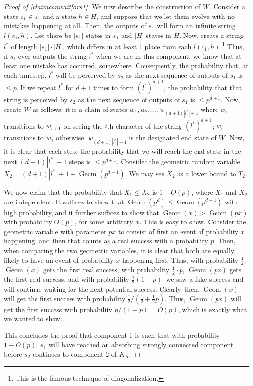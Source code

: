 \documentclass[12pt]{article}
\theoremstyle{definition}
\theoremstyle{remark}
\begin{document}
\begin{proof}[Proof of \cref{claimcanwaitfors1}]
        We now describe the construction of $W$. Consider a state $c_1 \in s_1$ and a state $h \in H$, and suppose that we let them evolve with no mistakes happening at all. Then, the outputs of $s_1$ will form an infinite string $l(c_1, h)$. Let there be $|s_1|$ states in $s_1$ and $|H|$ states in $H$. Now, create a string $l^*$ of length $|s_1| \cdot |H|$, which differs in at least 1 place from each $l(c_1,h)$.\footnote{This is the famous technique of diagonalization.} Thus, if $s_1$ ever outputs the string $l^*$ when we are in this component, we know that at least one mistake has occurred, somewhere. Consequently, the probability that, at each timestep, $l^*$ will be perceived by $s_2$ as the next sequence of outputs of $s_1$ is $\leq p$. 
        If we repeat $l^*$ for $d+1$ times to form $(l^*)^{d+1}$, the probability that that string is perceived by $s_2$ as the next sequence of outputs of $s_1$ is $\leq p^{d+1}$.
        Now, create $W$ as follows: it is a chain of states $w_1,w_2,\ldots,w_{(d+1)|l^*|+1}$ where $w_i$ transitions to $w_{i+1}$ on seeing the $i$th character of the string $(l^*)^{d+1}$; $w_i$ transitions to $w_1$ otherwise. $w_{(d+1)|l^*|+1}$ is the designated end state of $W$. Now, it is clear that each step, the probability that we will reach the end state in the next $(d+1)|l^*|+1$ steps is $\leq p^{d+1}$. Consider the geometric random variable $X_2 = (d+1)|l^*| + 1 + \operatorname{Geom} (p^{d+1})$. We may see $X_2$ as a lower bound to $T_2$.

        We now claim that the probability that $X_1 \leq X_2$ is $1 - O(p)$, where $X_1$ and $X_2$ are independent. It suffices to show that $\operatorname{Geom}(p^d) \leq \operatorname{Geom}(p^{d+1})$ with high probability, and it further suffices to show that $\operatorname{Geom}(x) > \operatorname{Geom}(px)$ with probability $O(p)$, for some arbitrary $x$. This is easy to show. Consider the geometric variable with parameter $px$ to consist of first an event of probability $x$ happening, and then that counts as a real success with a probability $p$. Then, when comparing the two geometric variables, it is clear that both are equally likely to have an event of probability $x$ happening first. Thus, with probability $\frac{1}{2}$, $\operatorname{Geom}(x)$ gets the first real success, with probability $\frac{1}{2} \cdot p$, $\operatorname{Geom}(px)$ gets the first real success, and with probability $\frac{1}{2} (1 - p)$, we saw a fake success and will continue waiting for the next potential success. Clearly, then, $\operatorname{Geom}(x)$ will get the first success with probability $\frac{1}{2} / (\frac{1}{2} + \frac{1}{2}p)$. Thus, $\operatorname{Geom}(px)$ will get the first success with probability $p / (1 + p) = O(p)$, which is exactly what we wanted to show.

        This concludes the proof that component 1 is such that with probability $1 - O(p)$, $s_1$ will have reached an absorbing strongly connected component before $s_2$ continues to component 2 of $K_H$.
      \end{proof}
\end{document}
